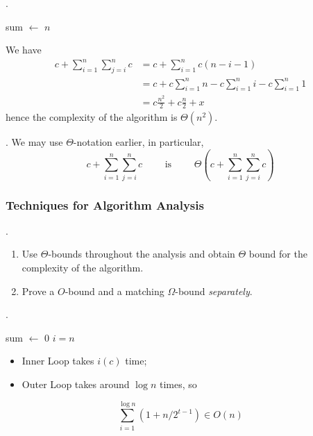 \documentclass{article}
\begin{document}
\begin{examplee}[].
    \begin{algorithm}[H] 
        sum $\leftarrow$ $n$\;
    \end{algorithm}
    We have \begin{align*}
        c + \sum_{i = 1}^n \sum_{j = i}^n c 
        & = c + \sum_{i = 1}^n c (n - i - 1) \\ 
        & = c + c \sum_{i = 1}^n n - c \sum_{i = 1}^n i - c \sum_{i = 1}^n 1 \\ 
        & = c \frac{n^2}{2} + c \frac{n}{2} + x
    \end{align*}
    hence the complexity of the algorithm is $\Theta(n^2)$. 
\end{examplee}

\begin{discovery}[].
    We may use $\Theta$-notation earlier, in particular, 
    \[ c + \sum_{i = 1}^n \sum_{j = i}^n c \qquad \text{ is } \qquad \Theta \left( c + \sum_{i = 1}^n \sum_{j = i}^n c \right) \]
\end{discovery}

\subsubsection{Techniques for Algorithm Analysis}

\begin{result}.
    \begin{enumerate}
        \item Use $\Theta$-bounds throughout the analysis and obtain $\Theta$ bound for the complexity of the algorithm. 
        \item Prove a $O$-bound and a matching $\Omega$-bound \textit{separately}. 
    \end{enumerate}
\end{result}

\begin{examplee}[].
    \begin{algorithm}[H] 
        sum $\leftarrow$ $0$\;
        $i = n$\; 
    \end{algorithm}
    \begin{itemize}
        \item Inner Loop takes $i(c)$ time; 
        \item Outer Loop takes around $\log n$ times, so 
    \end{itemize}
    \[ \sum_{i = 1}^{\log n} (1 + n / 2^{t - 1}) \in O(n) \]
\end{examplee}
\end{document}
